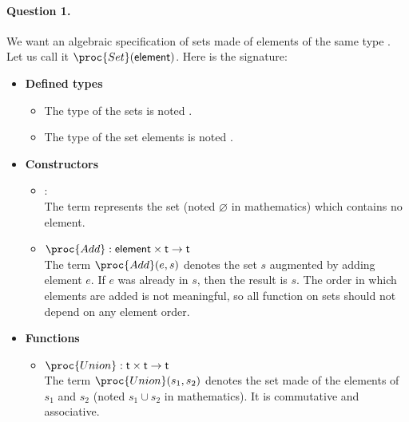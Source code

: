 \paragraph{Question 1.} We want an algebraic specification of sets
made of elements of the same type . Let us call it
\(\proc{Set}(\type{element})\). Here is the signature:
   \begin{itemize}

     \item \textbf{Defined types}

     \begin{itemize}

       \item The type of the sets is noted .

       \item The type of the set elements is noted .

     \end{itemize}

     \item \textbf{Constructors}
     \begin{itemize}

       \item {} : \\
       The term  represents the set (noted
       \(\varnothing\) in mathematics) which contains no element.

       \item \(\proc{Add} : \type{element} \times \type{t} \rightarrow
         \type{t}\)\\ The term \(\proc{Add} (e, s)\) denotes
         the set \(s\) augmented by adding element \(e\). If \(e\)
         was already in \(s\), then the result is \(s\). The order
         in which elements are added is not meaningful, so all
         function on sets should not depend on any element order.

     \end{itemize}

     \item \textbf{Functions}
     \begin{itemize}

       \item \(\proc{Union} : \type{t} \times \type{t} \rightarrow
         \type{t}\)\\
       The term \(\proc{Union} (s_1, s_2)\) denotes the set
       made of the elements of \(s_1\) and \(s_2\) (noted \(s_1
       \cup s_2\) in mathematics). It is commutative and
       associative.


\end{itemize}
\end{itemize}
